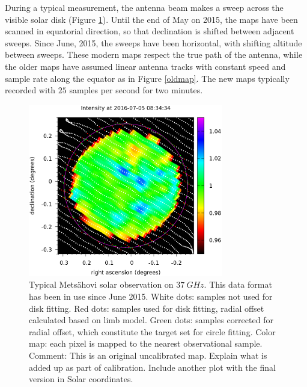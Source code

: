 \documentclass{aa}
\begin{document}
During a typical measurement, the antenna beam makes a sweep across the visible solar disk (Figure \ref{typicalmap}). 
Until the end of May on 2015, the maps have been scanned in equatorial direction, so that declination is shifted between
adjacent sweeps. Since June, 2015, the sweeps have been horizontal, with shifting altitude between sweeps. 
These modern 
maps respect the true path of the antenna, while the older maps have assumed linear antenna tracks with constant speed 
and 
sample rate along the equator as in Figure
\ref{oldmap}. The new maps typically recorded with $25$ samples per second for two minutes.

\begin{figure}
\centering
\includegraphics[width=8.5cm]{nea1467696874.png}
\caption{Typical Mets\"ahovi solar observation on $\SI{37}{GHz}$. This data format has been in use since June 2015. White dots: samples not used for disk fitting. Red 
dots: samples used for disk fitting, radial offset calculated based on limb model. Green dots: samples corrected for 
radial offset, which constitute the target set for circle fitting. Color map: each pixel is mapped to the nearest 
observational sample. Comment: This is an original uncalibrated map. Explain what is added up as part of calibration. Include another plot with the final version in Solar coordinates.}
\label{typicalmap}
\end{figure}
\end{document}
